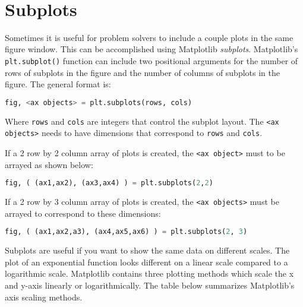 \documentclass{book}
\newcommand{\passthrough}[1]{#1}
\begin{document}
    \begin{center}
    \end{center}
    { \hspace*{\fill} \\}
    

    
        \hypertarget{subplots}{%
\section{Subplots}\label{subplots}}
    




    
        Sometimes it is useful for problem solvers to include a couple plots in
the same figure window. This can be accomplished using Matplotlib
\emph{subplots}. Matplotlib's \passthrough{\lstinline!plt.subplot()!}
function can include two positional arguments for the number of rows of
subplots in the figure and the number of columns of subplots in the
figure. The general format is:

\begin{lstlisting}[language=Python]
fig, <ax objects> = plt.subplots(rows, cols)
\end{lstlisting}

Where \passthrough{\lstinline!rows!} and \passthrough{\lstinline!cols!}
are integers that control the subplot layout. The
\passthrough{\lstinline!<ax objects>!} needs to have dimensions that
correspond to \passthrough{\lstinline!rows!} and
\passthrough{\lstinline!cols!}.

If a 2 row by 2 column array of plots is created, the
\passthrough{\lstinline!<ax object>!} must to be arrayed as shown below:

\begin{lstlisting}[language=Python]
fig, ( (ax1,ax2), (ax3,ax4) ) = plt.subplots(2,2)   
\end{lstlisting}

If a 2 row by 3 column array of plots is created, the
\passthrough{\lstinline!<ax objects>!} must be arrayed to correspond to
these dimensions:

\begin{lstlisting}[language=Python]
fig, ( (ax1,ax2,a3), (ax4,ax5,ax6) ) = plt.subplots(2, 3)   
\end{lstlisting}

Subplots are useful if you want to show the same data on different
scales. The plot of an exponential function looks different on a linear
scale compared to a logarithmic scale. Matplotlib contains three
plotting methods which scale the x and y-axis linearly or
logarithmically. The table below summarizes Matplotlib's axis scaling
methods.
\end{document}
